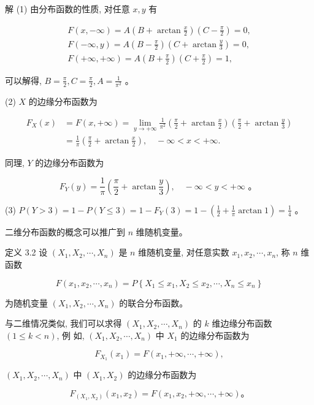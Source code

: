 \documentclass{beamer}
\begin{document}
	\begin{frame}
		解 (1) 由分布函数的性质, 对任意 $x, y$ 有
		
		$$
		\begin{gathered}
			F(x,-\infty)=A\left(B+\arctan \frac{x}{2}\right)\left(C-\frac{\pi}{2}\right)=0, \\
			F(-\infty, y)=A\left(B-\frac{\pi}{2}\right)\left(C+\arctan \frac{y}{3}\right)=0, \\
			F(+\infty,+\infty)=A\left(B+\frac{\pi}{2}\right)\left(C+\frac{\pi}{2}\right)=1,
		\end{gathered}
		$$
		
		可以解得, $B=\frac{\pi}{2}, C=\frac{\pi}{2}, A=\frac{1}{\pi^{2}}$ 。
		
		(2) $X$ 的边缘分布函数为
		
		$$
		\begin{aligned}
			F_{X}(x) & =F(x,+\infty)=\lim _{y \rightarrow+\infty} \frac{1}{\pi^{2}}\left(\frac{\pi}{2}+\arctan \frac{x}{2}\right)\left(\frac{\pi}{2}+\arctan \frac{y}{3}\right) \\
			& =\frac{1}{\pi}\left(\frac{\pi}{2}+\arctan \frac{x}{2}\right), \quad-\infty<x<+\infty .
		\end{aligned}
		$$
		
		同理, $Y$ 的边缘分布函数为
		
		$$
		F_{Y}(y)=\frac{1}{\pi}\left(\frac{\pi}{2}+\arctan \frac{y}{3}\right), \quad-\infty<y<+\infty \text { 。 }
		$$
		
		
	\end{frame}
	\begin{frame}
		(3) $P(Y>3)=1-P(Y \leqslant 3)=1-F_{Y}(3)=1-\left(\frac{1}{2}+\frac{1}{\pi} \arctan 1\right)=\frac{1}{4}$ 。
	\end{frame}
	
	\begin{frame}
		二维分布函数的概念可以推广到 $n$ 维随机变量。
		
		定义 3.2 设 $\left(X_{1}, X_{2}, \cdots, X_{n}\right)$ 是 $n$ 维随机变量, 对任意实数 $x_{1}, x_{2}, \cdots, x_{n}$, 称 $n$ 维 函数
		
		$$
		F\left(x_{1}, x_{2}, \cdots, x_{n}\right)=P\left\{X_{1} \leqslant x_{1}, X_{2} \leqslant x_{2}, \cdots, X_{n} \leqslant x_{n}\right\}
		$$
		
		为随机变量 $\left(X_{1}, X_{2}, \cdots, X_{n}\right)$ 的联合分布函数。
		
		与二维情况类似, 我们可以求得 $\left(X_{1}, X_{2}, \cdots, X_{n}\right)$ 的 $k$ 维边缘分布函数 $(1 \leqslant k<n)$, 例 如, $\left(X_{1}, X_{2}, \cdots, X_{n}\right)$ 中 $X_{1}$ 的边缘分布函数为
		
		$$
		F_{X_{1}}\left(x_{1}\right)=F\left(x_{1},+\infty, \cdots,+\infty\right),
		$$
		
		$\left(X_{1}, X_{2}, \cdots, X_{n}\right)$ 中 $\left(X_{1}, X_{2}\right)$ 的边缘分布函数为
		
		$$
		F_{\left(X_{1}, X_{2}\right)}\left(x_{1}, x_{2}\right)=F\left(x_{1}, x_{2},+\infty, \cdots,+\infty\right) 。
		$$
	\end{frame}
	
\end{document}
